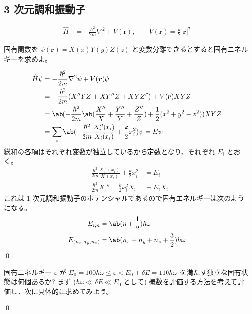 \documentclass[uplatex,dvipdfmx,a4paper,11pt]{jlreq}
\makeatletter
\newcommand{\rr}{\bm{r}}
\newcommand{\laplacian}{\nabla^2}
\theoremstyle{definition}
\renewenvironment{proof}[1][\proofname]{\par
  \normalfont
  \topsep6\p@\@plus6\p@ \trivlist
  \item[\hskip\labelsep{\bfseries #1}\@addpunct{\bfseries}]\ignorespaces\quad\par
}{%
  \qed\endtrivlist\@endpefalse
}
\renewcommand\proofname{証明}
\makeatother
\begin{document}
\subsection{3 次元調和振動子}
\begin{align}
  \hat{H} & = -\frac{\hbar^2}{2m}\laplacian + V(\rr), \qquad V(\rr) = \frac{k}{2}|\rr|^2
\end{align}
\begin{problem}
固有関数を $\psi(\rr) = X(x)Y(y)Z(z)$ と変数分離できるとすると固有エネルギーを求めよ。
\end{problem}
\begin{proof}
  \begin{align}
    \hat{H}\psi & = -\frac{\hbar^2}{2m}\laplacian\psi + V(\rr)\psi                                                               \\
                & = -\frac{\hbar^2}{2m}(X''YZ + XY''Z + XYZ'') + V(\rr)XYZ                                                       \\
                & = \ab(-\frac{\hbar^2}{2m}\ab(\frac{X''}{X} + \frac{Y''}{Y} + \frac{Z''}{Z}) + \frac{1}{2}(x^2 + y^2 + z^2))XYZ \\
                & = \sum_{i}\ab(-\frac{\hbar^2}{2m}\frac{X_i''(x_i)}{X_i(x_i)} + \frac{k}{2}x_i^2)\psi = E\psi
  \end{align}
  総和の各項はそれぞれ変数が独立しているから定数となり、それぞれ $E_i$ とおく。
  \begin{align}
    -\frac{\hbar^2}{2m}\frac{X_i''(x_i)}{X_i(x_i)} + \frac{k}{2}x_i^2 & = E_i    \\
    -\frac{\hbar^2}{2m}X_i'' + \frac{k}{2}x_i^2X_i                    & = E_iX_i
  \end{align}
  これは 1 次元調和振動子のポテンシャルであるので固有エネルギーは次のようになる。
  \begin{align}
    E_{i,n}             & = \ab(n + \frac{1}{2})\hbar\omega               \\
    E_{(n_x, n_y, n_z)} & = \ab(n_x + n_y + n_z + \frac{3}{2})\hbar\omega
  \end{align}
\end{proof}

\begin{problem}
固有エネルギー $\varepsilon$ が $E_0 = 100\hbar\omega \leq \varepsilon < E_0 + \delta E = 110\hbar\omega$ を満たす独立な固有状態は何個あるか? まず ($\hbar\omega\ll \delta E \ll E_0$ として) 概数を評価する方法を考えて評価し、次に具体的に求めてみよう。
\end{problem}
\begin{proof}

\end{proof}
\end{document}
